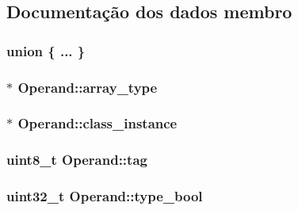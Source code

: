 \subsection{Documentação dos dados membro}
\subsubsection[{\texorpdfstring{"@16}{@16}}]{\setlength{\rightskip}{0pt plus 5cm}union \{ ... \} }\hypertarget{struct_operand_aadc70ab04271d71be5ac82ac2a896e74}{}\label{struct_operand_aadc70ab04271d71be5ac82ac2a896e74}
\subsubsection[{\texorpdfstring{array\+\_\+type}{array_type}}]{$\ast$ Operand\+::array\+\_\+type}\hypertarget{struct_operand_a79ddf8db90ba729dcee75f0f6669a8ca}{}\label{struct_operand_a79ddf8db90ba729dcee75f0f6669a8ca}
\subsubsection[{\texorpdfstring{class\+\_\+instance}{class_instance}}]{$\ast$ Operand\+::class\+\_\+instance}\hypertarget{struct_operand_a9afc0307304efd6930acb371bdabe4c2}{}\label{struct_operand_a9afc0307304efd6930acb371bdabe4c2}
\subsubsection[{\texorpdfstring{tag}{tag}}]{\setlength{\rightskip}{0pt plus 5cm}uint8\+\_\+t Operand\+::tag}\hypertarget{struct_operand_a551b2888783546b27f90b70f5ceeafee}{}\label{struct_operand_a551b2888783546b27f90b70f5ceeafee}
\subsubsection[{\texorpdfstring{type\+\_\+bool}{type_bool}}]{\setlength{\rightskip}{0pt plus 5cm}uint32\+\_\+t Operand\+::type\+\_\+bool}\hypertarget{struct_operand_a0705136abc78d06866591f4a1304163b}{}\label{struct_operand_a0705136abc78d06866591f4a1304163b}
